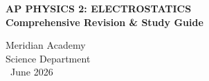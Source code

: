 \begin{tcolorbox}[
    enhanced,
    colback=primary,
    colframe=primary,
    arc=4pt,
    outer arc=4pt,
    left=15pt,
    right=15pt,
    top=12pt,
    bottom=12pt,
    boxsep=0pt
]
    \begin{minipage}[c]{0.65\linewidth}
        {\color{white}\fontsize{18}{22}\selectfont\bfseries\sffamily AP PHYSICS 2: ELECTROSTATICS} \\
        {\color{accent}\fontsize{12}{14}\selectfont\bfseries\sffamily Comprehensive Revision \& Study Guide}
    \end{minipage}%
    \begin{minipage}[c]{0.35\linewidth}
        \flushright
        {\color{white}\sffamily\small Meridian Academy \\ Science Department \\ \faCalendar\ June 2026}
    \end{minipage}
\end{tcolorbox}
\vspace{10pt}
